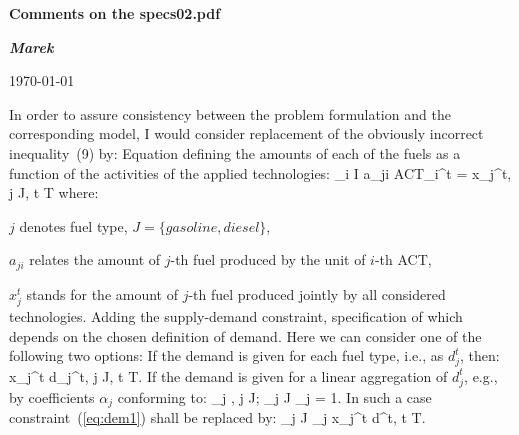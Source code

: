 \documentclass[a4paper,12pt]{article}
\begin{document}
\thispagestyle{empty}
\pagestyle{plain}
\centerline{\Large\bf Comments on the specs02.pdf}
\bigskip

\centerline{\large\bf {\em Marek}}
\bigskip

\centerline{\sc \today}

\bigskip
\bigskip

In order to assure consistency between the problem formulation and the
corresponding model, I would consider replacement of the obviously incorrect
inequality~(9) by:
\inum Equation defining the amounts of each of the fuels as a function of
the activities of the applied technologies:
	\be
	\sum_{i \in I} a_{ji} \cdot ACT_i^t = x_j^t, \quad j \in J,\; t \in T
	\ee
	where:
	\btlbs
	\item $j$ denotes fuel type, $J = \{gasoline, diesel\}$,
	\item $a_{ji}$ relates the amount of $j$-th fuel produced by the unit of
		$i$-th ACT,
	\item $x_j^t$ stands for the amount of $j$-th fuel produced jointly by all
		considered technologies.
	\etls
\inum Adding the supply-demand constraint, specification of which depends on the
	chosen definition of demand. Here we can consider one of the following two options:
	\inums If the demand is given for each fuel type, i.e., as $d_j^t$, then:
		\be\label{eq:dem1}
		x_j^t \ge d_j^t, \quad j \in J, t \in T.
		\ee
	\inums If the demand is given for a linear aggregation of $d_j^t$, e.g.,
		by coefficients $\alpha_j$ conforming to:
		 \le \alpha_j ,\; \forall j \in J; \quad \sum_{j \in J} \alpha_j = 1.
		\ee
		In such a case constraint~(\ref{eq:dem1}) shall be replaced by:
		\be
		\sum_{j \in J} \alpha_j x_j^t \ge d^t, \quad t \in T.
		\ee
	\etls
\etl
\end{document}
